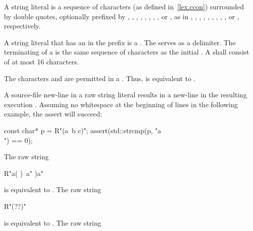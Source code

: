 \pnum
{}%
%
%
%
%
%
A string literal is a sequence of characters (as defined
in~\ref{lex.ccon}) surrounded by double quotes, optionally prefixed by
,
,
,
,
,
,
,
,
or ,
as in
,
,
,
,
,
,
,
,
,
or ,
respectively.

\pnum
A string literal that has an  in the prefix is a . The
 serves as a delimiter. The terminating
 of a  is the same sequence of
characters as the initial . A 
shall consist of at most 16 characters.

\pnum
\enternote The characters  and  are permitted in a
. Thus,  is equivalent to
. \exitnote

\pnum
\enternote A source-file new-line in a raw string literal results in a new-line in the
resulting execution . Assuming no
whitespace at the beginning of lines in the following example, the assert will succeed:

\begin{codeblock}
const char* p = R"(a\
b
c)";
assert(std::strcmp(p, "a\\\nb\nc") == 0);
\end{codeblock}
\exitnote

\pnum
\enterexample The raw string

\begin{codeblock}
R"a(
)\
a"
)a"
\end{codeblock}

is equivalent to . The raw string

\begin{codeblock}
R"(??)"
\end{codeblock}

is equivalent to . The raw string

